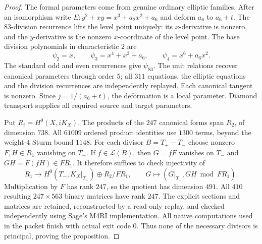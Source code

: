 \begin{proof}
The formal parameters come from genuine ordinary elliptic families.
After an isomorphism write
$E:y^2+xy=x^3+a_2x^2+a_6$ and deform $a_6$ to $a_6+t$.
The $83$-division recurrence lifts the level point uniquely: its
$x$-derivative is nonzero, and the $y$-derivative is the nonzero
$x$-coordinate of the level point.
The base division polynomials in characteristic $2$ are
\[
 \psi_2=x,\qquad \psi_3=x^4+x^3+a_6,\qquad
 \psi_4=x^6+a_6x^2.
\]
The standard odd and even recurrences give $\psi_{83}$.
The unit relations recover canonical parameters through order $5$;
all $311$ equations, the elliptic equations and the division
recurrences are independently replayed. Each canonical tangent is
nonzero. Since $j=1/(a_6+t)$, the deformation is a local parameter.
Diamond transport supplies all required source and target parameters.

Put $R_i=H^0(X,iK_X)$. The products of the $247$ canonical forms
span $R_2$, of dimension $738$.
All $61009$ ordered product identities use $1300$ terms, beyond the
weight-$4$ Sturm bound $1148$.
For each divisor $B=T_+-T_-$ choose nonzero $F,H\in R_1$
vanishing on $T_+$. If $f\in\mathcal L(B)$, then $G=fF$ vanishes
on $T_-$ and $GH=F(fH)\in F R_1$.
It therefore suffices to check injectivity of
\[
 R_1\longrightarrow H^0(T_-,K_X|_{T_-})\oplus R_2/F R_1,
 \qquad G\longmapsto(G|_{T_-},GH\bmod F R_1).
\]
Multiplication by $F$ has rank $247$, so the quotient has dimension
$491$. All $410$ resulting $247\times563$ binary matrices have rank
$247$. The explicit sections and matrices are retained,
reconstructed by a read-only replay, and checked independently using
Sage's M4RI implementation.
All native computations used in the packet finish with actual exit
code $0$. Thus none of the necessary divisors is principal, proving
the proposition.
\end{proof}

